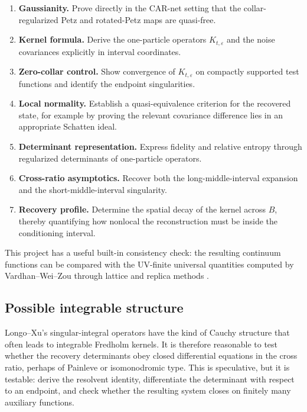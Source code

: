 \documentclass[11pt]{article}
\theoremstyle{accenttheorem}
\theoremstyle{definition}
\newcommand{\eps}{\varepsilon}
\newcommand{\1}{\mathbf{1}}
\begin{document}
\begin{enumerate}
\item \textbf{Gaussianity.}  Prove directly in the CAR-net setting that the collar-regularized Petz and rotated-Petz maps are quasi-free.

\item \textbf{Kernel formula.}  Derive the one-particle operators \(K_{t,\eps}\) and the noise covariances explicitly in interval coordinates.

\item \textbf{Zero-collar control.}  Show convergence of \(K_{t,\eps}\) on compactly supported test functions and identify the endpoint singularities.

\item \textbf{Local normality.}  Establish a quasi-equivalence criterion for the recovered state, for example by proving the relevant covariance difference lies in an appropriate Schatten ideal.

\item \textbf{Determinant representation.}  Express fidelity and relative entropy through regularized determinants of one-particle operators.

\item \textbf{Cross-ratio asymptotics.}  Recover both the long-middle-interval expansion and the short-middle-interval singularity.

\item \textbf{Recovery profile.}  Determine the spatial decay of the kernel across \(B\), thereby quantifying how nonlocal the reconstruction must be inside the conditioning interval.
\end{enumerate}

This project has a useful built-in consistency check: the resulting continuum functions can be compared with the UV-finite universal quantities computed by Vardhan--Wei--Zou through lattice and replica methods \cite{VardhanWeiZou}.

\subsection{Possible integrable structure}

Longo--Xu's singular-integral operators have the kind of Cauchy structure that often leads to integrable Fredholm kernels.  It is therefore reasonable to test whether the recovery determinants obey closed differential equations in the cross ratio, perhaps of Painleve or isomonodromic type.  This is speculative, but it is testable: derive the resolvent identity, differentiate the determinant with respect to an endpoint, and check whether the resulting system closes on finitely many auxiliary functions.
\end{document}
